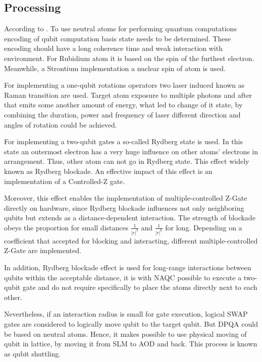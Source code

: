 \subsection{Processing}
According to \parencite{Wintersperger_2023, Philipp_Wondra_TUM_Thesis_for_Informatics.pdf}.
To use neutral atoms for performing quantum computations
encoding of qubit computation basis state needs to be determined.
These encoding should have a long coherence time and weak interaction with environment.
For Rubidium atom it is based on the spin of the furthest electron. 
Meanwhile, a Strontium implementation a nuclear spin of atom is used.

For implementing a one-qubit rotations operators two laser induced known as Raman transition are used.
Target atom exposure to multiple photons and after that emits some another amount of energy,
what led to change of it state, by combining the duration, power and frequency of laser  
different direction and angles of rotation could be achieved.

For implementing a two-qubit gates a so-called Rydberg state is used. 
In this state an outermost electron has a very huge influence on other atoms' electrons in arrangement.
Thus, other atom can not go in Rydberg state. This effect widely known as Rydberg blockade.
An effective impact of this effect is an implementation of a Controlled-Z gate.

Moreover, this effect enables the implementation of multiple-controlled Z-Gate directly on hardware,
since Rydberg blockade influences not only neighboring qubits but extends as a distance-dependent interaction.
The strength of blockade obeys the proportion for small distances \(\frac{1}{|r|^3}\) and \(\frac{1}{|r|^6}\) for long.
Depending on a coefficient that accepted for blocking and interacting, 
different multiple-controlled Z-Gate are implemented.

In addition, Rydberg blockade effect is used for long-range interactions between qubits within the acceptable distance, 
it is with \ac{NAQC} possible to execute a two-qubit gate 
and do not require specifically to place the atoms directly next to each other.

Nevertheless, if an interaction radius is small for gate execution,
logical SWAP gates are considered to logically move qubit to the target qubit.
But \ac{DPQA} could be based on neutral atoms. 
Hence, it makes possible to use physical moving of qubit in lattice, by moving it from \ac{SLM} to \ac{AOD} and back.
This process is known as qubit shuttling.

